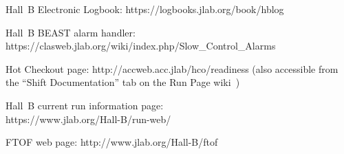 \documentclass[12pt]{article}
\begin{document}
\clearpage

\vfil
\eject

\begin{thebibliography}{99}

Hall~B Electronic Logbook: https://logbooks.jlab.org/book/hblog

Hall~B BEAST alarm handler: \\
https://clasweb.jlab.org/wiki/index.php/Slow\_Control\_Alarms

Hot Checkout page: http://accweb.acc.jlab/hco/readiness (also accessible from the
``Shift Documentation'' tab on the Run Page wiki~\cite{run-page})

Hall~B current run information page:\\
https://www.jlab.org/Hall-B/run-web/

FTOF web page: http://www.jlab.org/Hall-B/ftof

\end{thebibliography}
\end{document}
